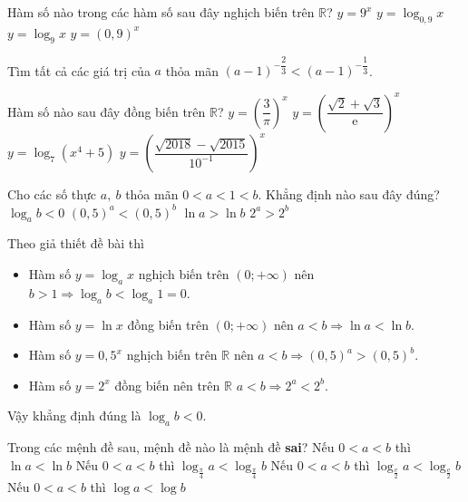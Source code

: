 \begin{ex}
	Hàm số nào trong các hàm số sau đây nghịch biến trên $\mathbb{R}$?
	\choice
	{$y=9^x$}
	{$y=\log_{0{,}9}x$}
	{$y=\log_9x$}
	{\True $y=\left(0{,}9\right)^x$}
\end{ex}

\begin{ex}%
	Tìm tất cả các giá trị của $a$ thỏa mãn $(a-1)^{-\dfrac{2}{3}}<(a-1)^{-\dfrac{1}{3}}$.
\end{ex}

\begin{ex}%
	Hàm số nào sau đây đồng biến trên $\mathbb{R}$?
	\choice
	{$y=\left( \dfrac{3}{\pi} \right)^x$}
	{\True $y=\left( \dfrac{\sqrt{2}+\sqrt{3}}{\mathrm{e}} \right)^x$}
	{$y=\log_7 \left( x^4+5 \right)$}
	{$y=\left(\dfrac{\sqrt{2018}-\sqrt{2015}}{10^{-1}}\right)^x$}
\end{ex}

\begin{ex}
	Cho các số thực $a,~b$ thỏa mãn $0<a<1<b$. Khẳng định nào sau đây đúng?
	\choice
	{\True $\log_a b<0$}
	{$(0{,}5)^a<(0{,}5)^b$}
	{$\ln a>\ln b$}
	{$2^a>2^b$}
	\loigiai
	{
		Theo giả thiết đề bài thì
		\begin{itemize}
			\item Hàm số $y=\log_a x$ nghịch biến trên $(0;+\infty)$ nên $b>1\Rightarrow\log_a b<\log_a1=0$.
			\item Hàm số $y=\ln x$ đồng biến trên $(0;+\infty)$ nên $a<b\Rightarrow\ln a <\ln b$.
			\item Hàm số $y=0{,5}^x$ nghịch biến trên $\mathbb{R}$ nên $a<b\Rightarrow(0{,}5)^a>(0{,}5)^b$.
			\item Hàm số $y=2^x$ đồng biến nên trên $\mathbb{R}$ $a<b\Rightarrow 2^a<2^b$.
		\end{itemize}
		Vậy khẳng định đúng là $\log_a b<0$.
	}
\end{ex}

\begin{ex}
	Trong các mệnh đề sau, mệnh đề nào là mệnh đề {\bf sai}?
	\choice
	{Nếu $0<a<b$ thì $\ln a<\ln b$}
	{\True Nếu $0<a<b$ thì $\log_{\tfrac{\pi}{4}} a<\log_{\tfrac{\pi}{4}}b$}
	{Nếu $0<a<b$ thì $\log_{\tfrac{\mathrm{e}}{2}} a<\log_{\tfrac{\mathrm{e}}{2}} b$}
	{Nếu $0<a<b$ thì $\log a<\log b$}
\end{ex}


